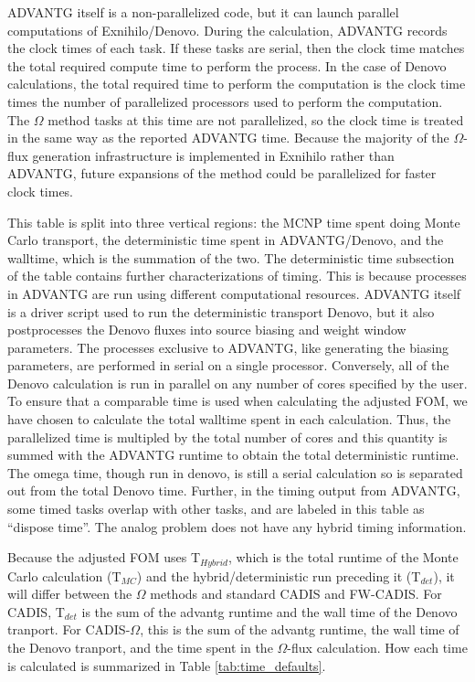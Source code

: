 ADVANTG itself is a non-parallelized
code, but it can launch parallel computations of Exnihilo/Denovo.
During the calculation,
ADVANTG records the clock times of each task. If these tasks are serial, then
the clock time matches the total required compute time to perform the process.
In the case of Denovo calculations, the total required time to perform the
computation is the clock time times the number of parallelized processors used
to perform the computation. The $\Omega$ method tasks at this time are not
parallelized, so the clock time is treated in the same way as the reported
ADVANTG time. Because the majority of the $\Omega$-flux generation
infrastructure is implemented in Exnihilo rather than ADVANTG, future expansions
of the method could be parallelized for faster clock times.

This table is split into three
vertical regions: the MCNP time spent doing Monte Carlo transport, the
deterministic time spent in ADVANTG/Denovo, and the walltime, which is the
summation of the two. The deterministic time subsection of the table contains
further characterizations of timing. This is because processes in ADVANTG are
run using different computational resources. ADVANTG itself is a driver script
used to run the deterministic transport Denovo, but it also postprocesses the
Denovo fluxes into source biasing and weight window parameters. The processes
exclusive to ADVANTG, like generating the biasing parameters, are performed in
serial on a single processor. Conversely, all of the Denovo calculation is run
in parallel on any number of cores specified by the user. To ensure that a
comparable time is used when calculating the adjusted FOM, we have chosen to
calculate the total walltime spent in each calculation. Thus, the parallelized
time is multipled by the total number of cores and this quantity is summed with
the ADVANTG runtime to obtain the total deterministic runtime. The omega time,
though run in denovo, is still a serial calculation so is separated out from the
total Denovo time. Further, in the timing output from ADVANTG, some timed tasks
overlap with other tasks, and are labeled in this table as ``dispose time''.
The analog problem does not have any hybrid timing information.

Because the adjusted FOM uses T$_{Hybrid}$, which is the total runtime of the
Monte Carlo calculation (T$_{MC}$) and the hybrid/deterministic run preceding it
(T$_{det}$), it will differ between
the $\Omega$ methods and standard CADIS and FW-CADIS. For CADIS, T$_{det}$ is
the sum of the advantg runtime and the wall time of the Denovo tranport. For
CADIS-$\Omega$, this is the sum of the advantg runtime, the wall time of the
Denovo tranport, and the time spent in the $\Omega$-flux calculation. How each
time is calculated is summarized in Table \ref{tab:time_defaults}.

